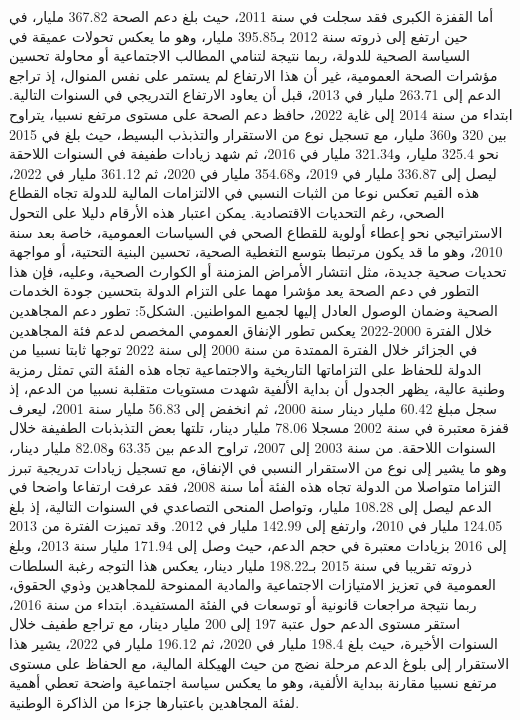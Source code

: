 \documentclass[12pt,a4paper]{report}
\begin{document}
أما القفزة الكبرى فقد سجلت في سنة 2011، حيث بلغ دعم الصحة 367.82 مليار، في حين ارتفع إلى ذروته سنة 2012 بـ395.85 مليار، وهو ما يعكس تحولات عميقة في السياسة الصحية للدولة، ربما نتيجة لتنامي المطالب الاجتماعية أو محاولة تحسين مؤشرات الصحة العمومية، غير أن هذا الارتفاع لم يستمر على نفس المنوال، إذ تراجع الدعم إلى 263.71 مليار في 2013، قبل أن يعاود الارتفاع التدريجي في السنوات التالية.
ابتداء من سنة 2014 إلى غاية 2022، حافظ دعم الصحة على مستوى مرتفع نسبيا، يتراوح بين 320 و360 مليار، مع تسجيل نوع من الاستقرار والتذبذب البسيط، حيث بلغ في 2015 نحو 325.4 مليار، و321.34 مليار في 2016، ثم شهد زيادات طفيفة في السنوات اللاحقة ليصل إلى 336.87 مليار في 2019، و354.68 مليار في 2020، ثم 361.12 مليار في 2022، هذه القيم تعكس نوعا من الثبات النسبي في الالتزامات المالية للدولة تجاه القطاع الصحي، رغم التحديات الاقتصادية.
يمكن اعتبار هذه الأرقام دليلا على التحول الاستراتيجي نحو إعطاء أولوية للقطاع الصحي في السياسات العمومية، خاصة بعد سنة 2010، وهو ما قد يكون مرتبطا بتوسع التغطية الصحية، تحسين البنية التحتية، أو مواجهة تحديات صحية جديدة، مثل انتشار الأمراض المزمنة أو الكوارث الصحية، وعليه، فإن هذا التطور في دعم الصحة يعد مؤشرا مهما على التزام الدولة بتحسين جودة الخدمات الصحية وضمان الوصول العادل إليها لجميع المواطنين.
الشكل5: تطور دعم المجاهدين خلال الفترة 2000-2022
يعكس تطور الإنفاق العمومي المخصص لدعم فئة المجاهدين في الجزائر خلال الفترة الممتدة من سنة 2000 إلى سنة 2022 توجها ثابتا نسبيا من الدولة للحفاظ على التزاماتها التاريخية والاجتماعية تجاه هذه الفئة التي تمثل رمزية وطنية عالية، يظهر الجدول أن بداية الألفية شهدت مستويات متقلبة نسبيا من الدعم، إذ سجل مبلغ 60.42 مليار دينار سنة 2000، ثم انخفض إلى 56.83 مليار سنة 2001، ليعرف قفزة معتبرة في سنة 2002 مسجلا 78.06 مليار دينار، تلتها بعض التذبذبات الطفيفة خلال السنوات اللاحقة.
من سنة 2003 إلى 2007، تراوح الدعم بين 63.35 و82.08 مليار دينار، وهو ما يشير إلى نوع من الاستقرار النسبي في الإنفاق، مع تسجيل زيادات تدريجية تبرز التزاما متواصلا من الدولة تجاه هذه الفئة أما سنة 2008، فقد عرفت ارتفاعا واضحا في الدعم ليصل إلى 108.28 مليار، وتواصل المنحى التصاعدي في السنوات التالية، إذ بلغ 124.05 مليار في 2010، وارتفع إلى 142.99 مليار في 2012.
وقد تميزت الفترة من 2013 إلى 2016 بزيادات معتبرة في حجم الدعم، حيث وصل إلى 171.94 مليار سنة 2013، وبلغ ذروته تقريبا في سنة 2015 بـ198.22 مليار دينار، يعكس هذا التوجه رغبة السلطات العمومية في تعزيز الامتيازات الاجتماعية والمادية الممنوحة للمجاهدين وذوي الحقوق، ربما نتيجة مراجعات قانونية أو توسعات في الفئة المستفيدة.
ابتداء من سنة 2016، استقر مستوى الدعم حول عتبة 197 إلى 200 مليار دينار، مع تراجع طفيف خلال السنوات الأخيرة، حيث بلغ 198.4 مليار في 2020، ثم 196.12 مليار في 2022، يشير هذا الاستقرار إلى بلوغ الدعم مرحلة نضج من حيث الهيكلة المالية، مع الحفاظ على مستوى مرتفع نسبيا مقارنة ببداية الألفية، وهو ما يعكس سياسة اجتماعية واضحة تعطي أهمية لفئة المجاهدين باعتبارها جزءا من الذاكرة الوطنية.
\end{document}
